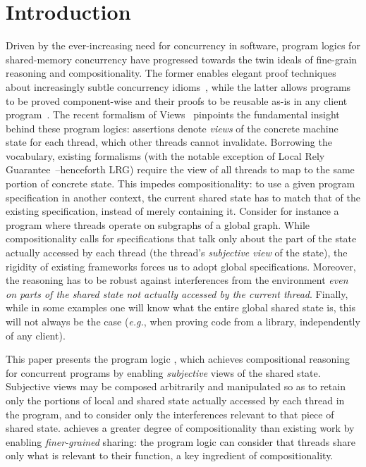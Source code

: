 \section{Introduction}


Driven by the ever-increasing need for concurrency in software,
program logics for shared-memory concurrency have progressed towards
the twin ideals of fine-grain reasoning and compositionality. The
former enables elegant proof techniques about increasingly subtle
concurrency idioms~\cite{vv06popl,vv07msc,todo}, while the latter
allows programs to be proved component-wise and their proofs to be
reusable as-is in any client
program~\cite{csl-tcs,cap-ecoop10,icap}.
The recent formalism of Views~\cite{views} pinpoints the fundamental
insight behind these program logics: assertions denote \emph{views} of
the concrete machine state for each thread, which other threads cannot
invalidate. Borrowing the vocabulary, existing formalisms (with the
notable exception of Local Rely Guarantee~\cite{lrg}--henceforth LRG)
require the view of all threads to map to the same portion of concrete
state. This impedes compositionality: to use a given program
specification in another context, the current shared state has to
match that of the existing specification, instead of merely containing
it. Consider for instance a program where threads operate on subgraphs
of a global graph. While compositionality calls for specifications
that talk only about the part of the state actually accessed by each
thread (the thread's \emph{subjective view} of the state), the
rigidity of existing frameworks forces us to adopt global
specifications. Moreover, the reasoning has to be robust against
interferences from the environment \emph{even on parts of the shared
  state not actually accessed by the current thread}. Finally, while
in some examples one will know what the entire global shared state is,
this will not always be the case (\textit{e.g.}, when proving code
from a library, independently of any client).

This paper presents the program logic \colosl, which achieves
compositional reasoning for concurrent programs by enabling
\emph{subjective} views of the shared state. Subjective views may be
composed arbitrarily and manipulated so as to retain only the portions
of local and shared state actually accessed by each thread in the
program, and to consider only the interferences relevant to that piece
of shared state. \colosl achieves a greater degree of compositionality
than existing work by enabling \emph{finer-grained} sharing: the
program logic can consider that threads share only what is relevant to
their function, a key ingredient of compositionality.

